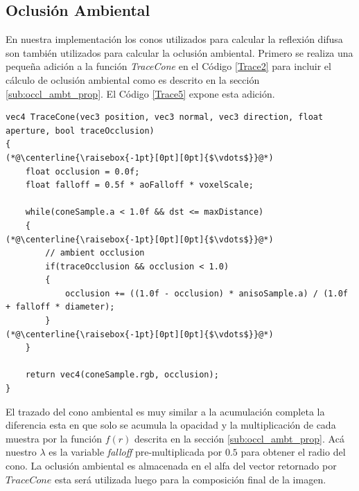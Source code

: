\subsection{Oclusión Ambiental} %
\label{sub:oclusion_ambient}
En nuestra implementación los conos utilizados para calcular la reflexión difusa son también utilizados para calcular la oclusión ambiental. Primero se realiza una pequeña adición a la función \emph{TraceCone} en el Código \ref{Trace2} para incluir el cálculo de oclusión ambiental como es descrito en la sección \ref{sub:occl_ambt_prop}. El Código \ref{Trace5} expone esta adición.
\\
\begin{lstlisting}[caption={Oclusión ambiental para el algoritmo de trazado de conos.}, label=Trace5]
vec4 TraceCone(vec3 position, vec3 normal, vec3 direction, float aperture, bool traceOcclusion)
{
(*@\centerline{\raisebox{-1pt}[0pt][0pt]{$\vdots$}}@*)
    float occlusion = 0.0f;
    float falloff = 0.5f * aoFalloff * voxelScale;

    while(coneSample.a < 1.0f && dst <= maxDistance)
    {
(*@\centerline{\raisebox{-1pt}[0pt][0pt]{$\vdots$}}@*)
        // ambient occlusion
        if(traceOcclusion && occlusion < 1.0)
        {
            occlusion += ((1.0f - occlusion) * anisoSample.a) / (1.0f + falloff * diameter);
        }
(*@\centerline{\raisebox{-1pt}[0pt][0pt]{$\vdots$}}@*)
    }

    return vec4(coneSample.rgb, occlusion);
}
\end{lstlisting}
El trazado del cono ambiental es muy similar a la acumulación completa la diferencia esta en que solo se acumula la opacidad y la multiplicación de cada muestra por la función $f(r)$ descrita en la sección \ref{sub:occl_ambt_prop}. Acá nuestro $\lambda$ es la variable \emph{falloff} pre-multiplicada por $0.5$ para obtener el radio del cono. La oclusión ambiental es almacenada en el alfa del vector retornado por $TraceCone$ esta será utilizada luego para la composición final de la imagen.

